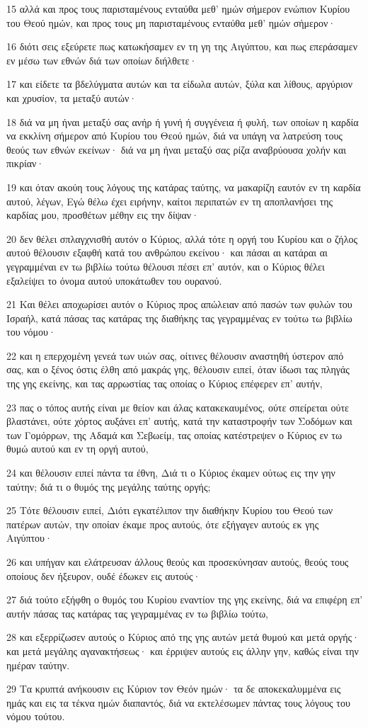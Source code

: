 \par 15 αλλά και προς τους παρισταμένους ενταύθα μεθ' ημών σήμερον ενώπιον Κυρίου του Θεού ημών, και προς τους μη παρισταμένους ενταύθα μεθ' ημών σήμερον·
\par 16 διότι σεις εξεύρετε πως κατωκήσαμεν εν τη γη της Αιγύπτου, και πως επεράσαμεν εν μέσω των εθνών διά των οποίων διήλθετε·
\par 17 και είδετε τα βδελύγματα αυτών και τα είδωλα αυτών, ξύλα και λίθους, αργύριον και χρυσίον, τα μεταξύ αυτών·
\par 18 διά να μη ήναι μεταξύ σας ανήρ ή γυνή ή συγγένεια ή φυλή, των οποίων η καρδία να εκκλίνη σήμερον από Κυρίου του Θεού ημών, διά να υπάγη να λατρεύση τους θεούς των εθνών εκείνων· διά να μη ήναι μεταξύ σας ρίζα αναβρύουσα χολήν και πικρίαν·
\par 19 και όταν ακούη τους λόγους της κατάρας ταύτης, να μακαρίζη εαυτόν εν τη καρδία αυτού, λέγων, Εγώ θέλω έχει ειρήνην, καίτοι περιπατών εν τη αποπλανήσει της καρδίας μου, προσθέτων μέθην εις την δίψαν·
\par 20 δεν θέλει σπλαγχνισθή αυτόν ο Κύριος, αλλά τότε η οργή του Κυρίου και ο ζήλος αυτού θέλουσιν εξαφθή κατά του ανθρώπου εκείνου· και πάσαι αι κατάραι αι γεγραμμέναι εν τω βιβλίω τούτω θέλουσι πέσει επ' αυτόν, και ο Κύριος θέλει εξαλείψει το όνομα αυτού υποκάτωθεν του ουρανού.
\par 21 Και θέλει αποχωρίσει αυτόν ο Κύριος προς απώλειαν από πασών των φυλών του Ισραήλ, κατά πάσας τας κατάρας της διαθήκης τας γεγραμμένας εν τούτω τω βιβλίω του νόμου·
\par 22 και η επερχομένη γενεά των υιών σας, οίτινες θέλουσιν αναστηθή ύστερον από σας, και ο ξένος όστις έλθη από μακράς γης, θέλουσιν ειπεί, όταν ίδωσι τας πληγάς της γης εκείνης, και τας αρρωστίας τας οποίας ο Κύριος επέφερεν επ' αυτήν,
\par 23 πας ο τόπος αυτής είναι με θείον και άλας κατακεκαυμένος, ούτε σπείρεται ούτε βλαστάνει, ούτε χόρτος αυξάνει επ' αυτής, κατά την καταστροφήν των Σοδόμων και των Γομόρρων, της Αδαμά και Σεβωείμ, τας οποίας κατέστρεψεν ο Κύριος εν τω θυμώ αυτού και εν τη οργή αυτού,
\par 24 και θέλουσιν ειπεί πάντα τα έθνη, Διά τι ο Κύριος έκαμεν ούτως εις την γην ταύτην; διά τι ο θυμός της μεγάλης ταύτης οργής;
\par 25 Τότε θέλουσιν ειπεί, Διότι εγκατέλιπον την διαθήκην Κυρίου του Θεού των πατέρων αυτών, την οποίαν έκαμε προς αυτούς, ότε εξήγαγεν αυτούς εκ γης Αιγύπτου·
\par 26 και υπήγαν και ελάτρευσαν άλλους θεούς και προσεκύνησαν αυτούς, θεούς τους οποίους δεν ήξευρον, ουδέ έδωκεν εις αυτούς·
\par 27 διά τούτο εξήφθη ο θυμός του Κυρίου εναντίον της γης εκείνης, διά να επιφέρη επ' αυτήν πάσας τας κατάρας τας γεγραμμένας εν τω βιβλίω τούτω,
\par 28 και εξερρίζωσεν αυτούς ο Κύριος από της γης αυτών μετά θυμού και μετά οργής· και μετά μεγάλης αγανακτήσεως· και έρριψεν αυτούς εις άλλην γην, καθώς είναι την ημέραν ταύτην.
\par 29 Τα κρυπτά ανήκουσιν εις Κύριον τον Θεόν ημών· τα δε αποκεκαλυμμένα εις ημάς και εις τα τέκνα ημών διαπαντός, διά να εκτελέσωμεν πάντας τους λόγους του νόμου τούτου.

